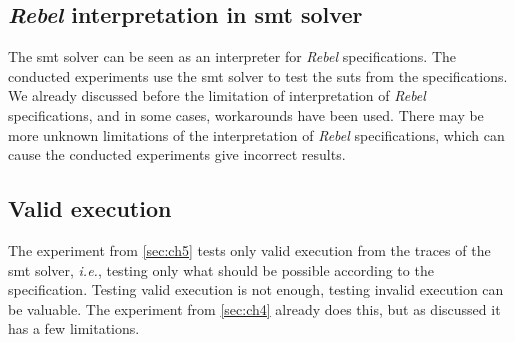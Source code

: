 \subsection*{\textit{Rebel} interpretation in \gls{smt} solver}
The \gls{smt} solver can be seen as an interpreter for \textit{Rebel} specifications. The
conducted experiments use the \gls{smt} solver to test the \gls{sut}s from the
specifications. We already discussed before the limitation of interpretation of
\textit{Rebel} specifications, and in some cases, workarounds have been used. There may
be more unknown limitations of the interpretation of \textit{Rebel} specifications, which
can cause the conducted experiments give incorrect results.

\subsection*{Valid execution}
The experiment from \autoref{sec:ch5} tests only valid execution from the traces
of the \gls{smt} solver, \textit{i.e.}, testing only what should be possible
according to the specification. Testing valid execution is not enough, testing
invalid execution can be valuable. The experiment from \autoref{sec:ch4} already
does this, but as discussed it has a few limitations.
